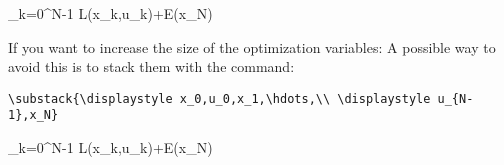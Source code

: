 \documentclass[]{report}
\begin{document}
\begin{mini!}
	{}
	{\sum_{k=0}^{N-1} L(x_k,u_k)\!\!+\!\!E(x_N)\label{OCPobj}}
	{\label{eq:OCP}}{}
\end{mini!}

\noindent If you want to increase the size of the optimization variables:
\noindent A possible way to avoid this is to stack them with the command: \begin{verbatim}
\substack{\displaystyle x_0,u_0,x_1,\hdots,\\ \displaystyle u_{N-1},x_N}
\end{verbatim}

\begin{mini!}
	{}
	{\sum_{k=0}^{N-1} L(x_k,u_k)\!\!+\!\!E(x_N)\label{OCPobj}}
	{\label{eq:OCP}}{}
\end{mini!}
\end{document}
